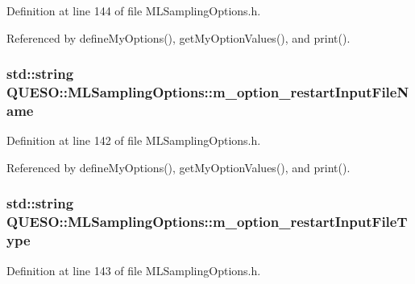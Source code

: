 Definition at line 144 of file M\-L\-Sampling\-Options.\-h.



Referenced by define\-My\-Options(), get\-My\-Option\-Values(), and print().

\hypertarget{class_q_u_e_s_o_1_1_m_l_sampling_options_a0fbc7946acb9944500d92503a1a0feaf}{
\subsubsection[{m\-\_\-option\-\_\-restart\-Input\-File\-Name}]{\setlength{\rightskip}{0pt plus 5cm}std\-::string Q\-U\-E\-S\-O\-::\-M\-L\-Sampling\-Options\-::m\-\_\-option\-\_\-restart\-Input\-File\-Name\hspace{0.3cm}{\ttfamily [private]}}}\label{class_q_u_e_s_o_1_1_m_l_sampling_options_a0fbc7946acb9944500d92503a1a0feaf}


Definition at line 142 of file M\-L\-Sampling\-Options.\-h.



Referenced by define\-My\-Options(), get\-My\-Option\-Values(), and print().

\hypertarget{class_q_u_e_s_o_1_1_m_l_sampling_options_a3fa31b5691319385226e2149b549e269}{
\subsubsection[{m\-\_\-option\-\_\-restart\-Input\-File\-Type}]{\setlength{\rightskip}{0pt plus 5cm}std\-::string Q\-U\-E\-S\-O\-::\-M\-L\-Sampling\-Options\-::m\-\_\-option\-\_\-restart\-Input\-File\-Type\hspace{0.3cm}{\ttfamily [private]}}}\label{class_q_u_e_s_o_1_1_m_l_sampling_options_a3fa31b5691319385226e2149b549e269}


Definition at line 143 of file M\-L\-Sampling\-Options.\-h.



